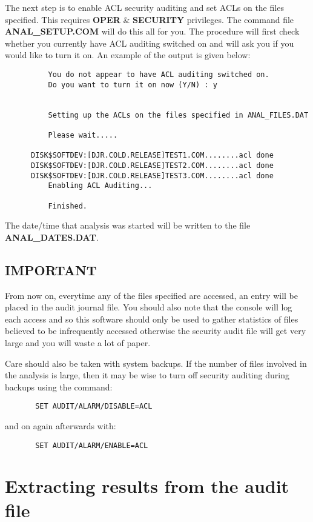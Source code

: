 The next step is to enable ACL security auditing and set ACLs on the files
specified. This requires {\bf OPER} \& {\bf SECURITY} privileges. The command
file {\bf ANAL\_SETUP.COM} will do this all for you. The procedure will first
check whether you currently have ACL auditing switched on and will ask you if
you would like to turn it on. An example of the output is given below:

\begin{verbatim}
          You do not appear to have ACL auditing switched on.
          Do you want to turn it on now (Y/N) : y


          Setting up the ACLs on the files specified in ANAL_FILES.DAT

          Please wait.....

      DISK$SOFTDEV:[DJR.COLD.RELEASE]TEST1.COM........acl done
      DISK$SOFTDEV:[DJR.COLD.RELEASE]TEST2.COM........acl done
      DISK$SOFTDEV:[DJR.COLD.RELEASE]TEST3.COM........acl done
          Enabling ACL Auditing...

          Finished.
\end{verbatim}

The date/time that analysis was started will be written to the file {\bf
ANAL\_DATES.DAT}.

\subsection{IMPORTANT}

From now on, everytime any of the files specified are accessed, an entry will
be placed in the audit journal file.  You should also note that the console
will log each access and so this software should only be used to gather
statistics of files believed to be infrequently accessed otherwise the security
audit file will get very large and you will waste a lot of paper.

Care should also be taken with system backups. If the number of files involved
in the analysis is large, then it may be wise to turn off security auditing
during backups using the command:

\begin{verbatim}
       SET AUDIT/ALARM/DISABLE=ACL
\end{verbatim}
and on again afterwards with:
\begin{verbatim}
       SET AUDIT/ALARM/ENABLE=ACL
\end{verbatim}

\section{Extracting results from the audit file}

